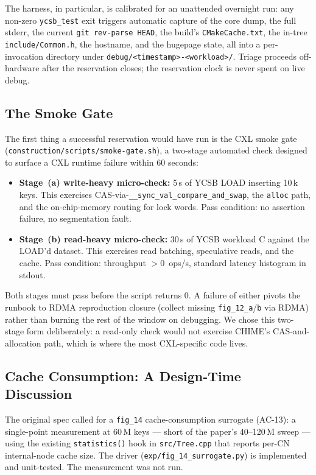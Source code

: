 \documentclass[11pt,a4paper]{article}
\begin{document}
The harness, in particular, is calibrated for an unattended overnight run: any non-zero \texttt{ycsb\_test} exit triggers automatic capture of the core dump, the full stderr, the current \texttt{git rev-parse HEAD}, the build's \texttt{CMakeCache.txt}, the in-tree \texttt{include/Common.h}, the hostname, and the hugepage state, all into a per-invocation directory under \texttt{debug/<timestamp>-<workload>/}. Triage proceeds off-hardware after the reservation closes; the reservation clock is never spent on live debug.

\subsection{The Smoke Gate}

The first thing a successful reservation would have run is the CXL smoke gate (\texttt{construction/scripts/smoke-gate.sh}), a two-stage automated check designed to surface a CXL runtime failure within 60 seconds:

\begin{itemize}[nosep]
    \item \textbf{Stage~(a) write-heavy micro-check:} 5\,s of YCSB LOAD inserting 10\,k keys. This exercises CAS-via-\texttt{\_\_sync\_val\_compare\_and\_swap}, the \texttt{alloc} path, and the on-chip-memory routing for lock words. Pass condition: no assertion failure, no segmentation fault.
    \item \textbf{Stage~(b) read-heavy micro-check:} 30\,s of YCSB workload C against the LOAD'd dataset. This exercises read batching, speculative reads, and the cache. Pass condition: throughput $> 0$~ops/s, standard latency histogram in stdout.
\end{itemize}

Both stages must pass before the script returns 0. A failure of either pivots the runbook to RDMA reproduction closure (collect missing \texttt{fig\_12\_a}/\texttt{b} via RDMA) rather than burning the rest of the window on debugging. We chose this two-stage form deliberately: a read-only check would not exercise CHIME's CAS-and-allocation path, which is where the most CXL-specific code lives.

\subsection{Cache Consumption: A Design-Time Discussion}
\label{sec:cxl-fig14}

The original spec called for a \texttt{fig\_14} cache-consumption surrogate (AC-13): a single-point measurement at 60\,M keys --- short of the paper's 40--120\,M sweep --- using the existing \texttt{statistics()} hook in \texttt{src/Tree.cpp} that reports per-CN internal-node cache size. The driver (\texttt{exp/fig\_14\_surrogate.py}) is implemented and unit-tested. The measurement was not run.
\end{document}
